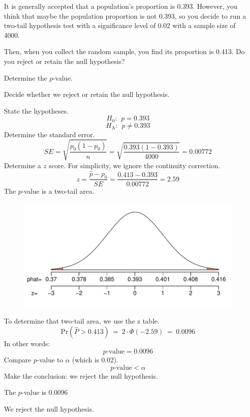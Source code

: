 
\begin{question}
It is generally accepted that a population's proportion is 0.393.
However, you think that maybe the population proportion is not 0.393, so
you decide to run a two-tail hypothesis test with a significance level
of 0.02 with a sample size of 4000.

Then, when you collect the random sample, you find its proportion is
0.413. Do you reject or retain the null hypothesis?
\begin{answerlist}
  \item Determine the \(p\)-value.
  \item Decide whether we reject or retain the null hypothesis.
\end{answerlist}
\end{question}

\begin{solution}
State the hypotheses. \[H_0: ~~ p = 0.393 \]
\[H_\text{A}: ~~ p \ne 0.393\] Determine the standard error.
\[SE = \sqrt{\frac{p_0(1-p_0)}{n}} = \sqrt{\frac{0.393(1-0.393)}{4000}} = 0.00772 \]
Determine a \(z\) score. For simplicity, we ignore the continuity
correction.
\[z = \frac{\hat{p}-p_0}{SE} = \frac{0.413-0.393}{0.00772} = 2.59 \] The
\(p\)-value is a two-tail area.

\begin{figure}[htbp]
\centering
\includegraphics{p_single_test_twotail-1.pdf}
\caption{}
\end{figure}

To determine that two-tail area, we use the z table.
\[\text{Pr}\left(\hat{P} > 0.413\right) ~=~ 2\cdot \Phi(-2.59) ~=~ 0.0096 \]
In other words: \[p\text{-value} = 0.0096\] Compare \(p\)-value to
\(\alpha\) (which is 0.02). \[p\text{-value} < \alpha \] Make the
conclusion: we reject the null hypothesis.
\begin{answerlist}
  \item The \(p\)-value is 0.0096
  \item We reject the null hypothesis.
\end{answerlist}
\end{solution}

